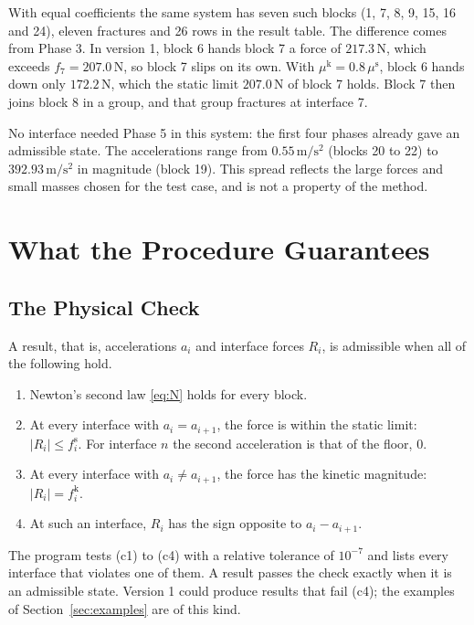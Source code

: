 \documentclass[11pt,a4paper]{article}
\newcommand{\fs}{f^{\mathrm{s}}}
\newcommand{\fkin}{f^{\mathrm{k}}}
\newcommand{\mus}{\mu^{\mathrm{s}}}
\newcommand{\muk}{\mu^{\mathrm{k}}}
\begin{document}
With equal coefficients the same system has seven such blocks (1, 7, 8, 9, 15, 16 and 24), eleven fractures and 26 rows in the result table. The difference comes from Phase 3. In version 1, block 6 hands block 7 a force of $217.3\,\mathrm{N}$, which exceeds $f_7=207.0\,\mathrm{N}$, so block 7 slips on its own. With $\muk=0.8\,\mus$, block 6 hands down only $172.2\,\mathrm{N}$, which the static limit $207.0\,\mathrm{N}$ of block 7 holds. Block 7 then joins block 8 in a group, and that group fractures at interface 7.

No interface needed Phase 5 in this system: the first four phases already gave an admissible state. The accelerations range from $0.55\,\mathrm{m/s^2}$ (blocks 20 to 22) to $392.93\,\mathrm{m/s^2}$ in magnitude (block 19). This spread reflects the large forces and small masses chosen for the test case, and is not a property of the method.

\section{What the Procedure Guarantees}\label{sec:guarantees}

\subsection{The Physical Check}\label{sec:check}

A result, that is, accelerations $a_i$ and interface forces $R_i$, is admissible when all of the following hold.
\begin{enumerate}[label=(c\arabic*)]
\item Newton's second law \eqref{eq:N} holds for every block.
\item At every interface with $a_i=a_{i+1}$, the force is within the static limit: $|R_i|\le\fs_i$. For interface $n$ the second acceleration is that of the floor, $0$.
\item At every interface with $a_i\ne a_{i+1}$, the force has the kinetic magnitude: $|R_i|=\fkin_i$.
\item At such an interface, $R_i$ has the sign opposite to $a_i-a_{i+1}$.
\end{enumerate}
The program tests (c1) to (c4) with a relative tolerance of $10^{-7}$ and lists every interface that violates one of them. A result passes the check exactly when it is an admissible state. Version 1 could produce results that fail (c4); the examples of Section~\ref{sec:examples} are of this kind.
\end{document}
